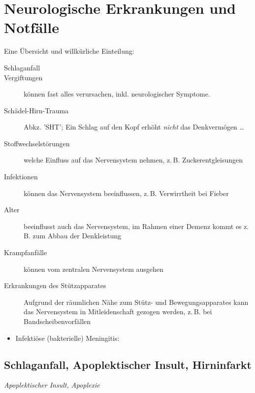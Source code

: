 \clearpage
\section{Neurologische Erkrankungen und Notfälle}


Eine Übersicht und willkürliche Einteilung:

\begin{description}
  \item [Schlaganfall]
  \item [Vergiftungen] können fast alles verursachen, inkl. neurologischer
  Symptome.
  \item [Schädel-Hirn-Trauma] Abkz. 'SHT'; Ein Schlag auf
  den Kopf erhöht \emph{nicht} das Denkvermögen \ldots
  \item [Stoffwechselstörungen] welche Einfluss auf das Nervensystem nehmen, z.\,B. Zuckerentgleisungen
  \item [Infektionen] können das Nervensystem beeinflussen, z.\,B. Verwirrtheit bei Fieber
  \item [Alter] beeinflusst auch das Nervensystem, im Rahmen einer Demenz kommt es z.\,B. zum Abbau der Denkleistung
  \item [Krampfanfälle] können vom zentralen Nervensystem ausgehen
  \item [Erkrankungen des Stützapparates] Aufgrund der räumlichen Nähe zum Stütz- und Bewegungsapparates kann das Nervensystem in Mitleidenschaft gezogen werden, z.\,B. bei Bandscheibenvorfällen
\end{description}


\begin{itemize}
  \item Infektiöse (bakterielle) Meningitis:
\end{itemize}


\subsection{Schlaganfall, Apoplektischer Insult, Hirninfarkt}
\label{topic:tia}

\emph{ Apoplektischer Insult, Apoplexie}

